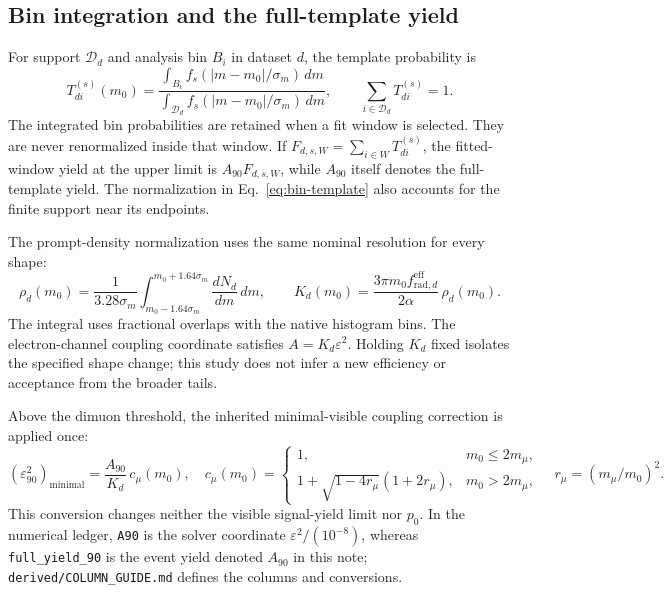 \documentclass[11pt]{article}
\newcommand{\eps}{\varepsilon}
\newcommand{\sig}{\sigma_m}
\newcommand{\studtable}[2]{\begin{table}[H]\centering\small
 \caption{#2}\end{table}}
\begin{document}
\clearpage
\subsection{Bin integration and the full-template yield}
For support $\mathcal D_d$ and analysis bin $B_i$ in dataset $d$, the
template probability is
\begin{equation}
 T_{di}^{(s)}(m_0)=
 \frac{\displaystyle\int_{B_i}f_s(|m-m_0|/\sig)\,dm}
 {\displaystyle\int_{\mathcal D_d}f_s(|m-m_0|/\sig)\,dm},
 \qquad \sum_{i\in\mathcal D_d}T_{di}^{(s)}=1.
 \label{eq:bin-template}
\end{equation}
The integrated bin probabilities are retained when a fit window is
selected. They are never renormalized inside that window. If
$F_{d,s,W}=\sum_{i\in W}T_{di}^{(s)}$, the fitted-window yield at the
upper limit is $A_{90}F_{d,s,W}$, while $A_{90}$ itself denotes the
full-template yield. The normalization in Eq.~\eqref{eq:bin-template}
also accounts for the finite support near its endpoints.

\studtable{../derived/shape_table.tex}{Numerical shape properties for
the declared tail prescriptions, evaluated on the full line. The core
upper-limit ratio is the ideal proportional-core normalization ratio.
Actual fitted templates use the finite support in
Eq.~\eqref{eq:bin-template}.}

The prompt-density normalization uses the same nominal resolution for
every shape:
\begin{equation}
 \rho_d(m_0)=\frac{1}{3.28\sig}
 \int_{m_0-1.64\sig}^{m_0+1.64\sig}\frac{dN_d}{dm}\,dm,
 \qquad
 K_d(m_0)=\frac{3\pi m_0 f_{\mathrm{rad},d}^{\mathrm{eff}}}
 {2\alpha}\,\rho_d(m_0).
 \label{eq:conversion}
\end{equation}
The integral uses fractional overlaps with the native histogram bins.
The electron-channel coupling coordinate satisfies $A=K_d\eps^2$.
Holding $K_d$ fixed isolates the specified shape change; this study does
not infer a new efficiency or acceptance from the broader tails.

Above the dimuon threshold, the inherited minimal-visible coupling
correction is applied once:
\begin{equation}
 (\eps^2_{90})_{\mathrm{minimal}}=\frac{A_{90}}{K_d}\,c_\mu(m_0),
 \quad c_\mu(m_0)=
 \begin{cases}
 1,&m_0\leq2m_\mu,\\
 1+\sqrt{1-4r_\mu}(1+2r_\mu),&m_0>2m_\mu,
 \end{cases}
 \quad r_\mu=(m_\mu/m_0)^2.
\end{equation}
This conversion changes neither the visible signal-yield limit nor $p_0$.
In the numerical ledger, \texttt{A90} is the solver coordinate
$\eps^2/(10^{-8})$, whereas \texttt{full\_yield\_90} is the event yield
denoted $A_{90}$ in this note; \texttt{derived/COLUMN\_GUIDE.md} defines
the columns and conversions.
\end{document}

